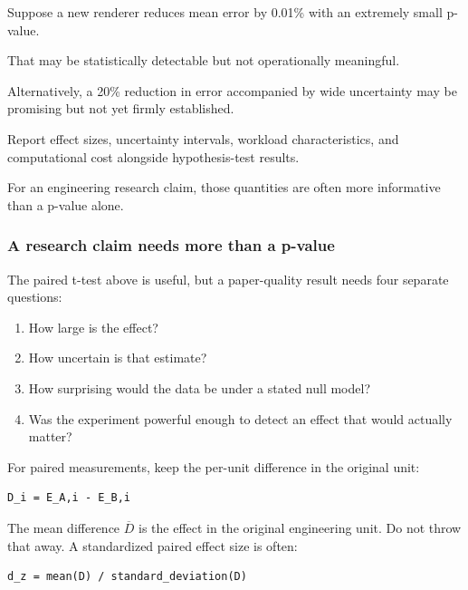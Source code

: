 \hypertarget{02-foundations-ii-ch030-statistical-significance-versus-practical-significance}{}

Suppose a new renderer reduces mean error by 0.01\% with an extremely small p-value.

That may be statistically detectable but not operationally meaningful.

Alternatively, a 20\% reduction in error accompanied by wide uncertainty may be promising but not yet firmly established.

Report effect sizes, uncertainty intervals, workload characteristics, and computational cost alongside hypothesis-test results.

For an engineering research claim, those quantities are often more informative than a p-value alone.

\subsubsection{A research claim needs more than a p-value}\label{02-foundations-ii-ch030-a-research-claim-needs-more-than-a-p-value}

\hypertarget{02-foundations-ii-ch030-a-research-claim-needs-more-than-a-p-value}{}

The paired t-test above is useful, but a paper-quality result needs four separate questions:

\begin{enumerate}
\def\labelenumi{\arabic{enumi}.}
\tightlist
\item
  How large is the effect?
\item
  How uncertain is that estimate?
\item
  How surprising would the data be under a stated null model?
\item
  Was the experiment powerful enough to detect an effect that would actually matter?
\end{enumerate}

For paired measurements, keep the per-unit difference in the original unit:

\begin{verbatim}
D_i = E_A,i - E_B,i
\end{verbatim}

The mean difference \(\overline{D}\) is the effect in the original engineering unit. Do not throw that away. A standardized paired effect size is often:

\begin{verbatim}
d_z = mean(D) / standard_deviation(D)
\end{verbatim}

